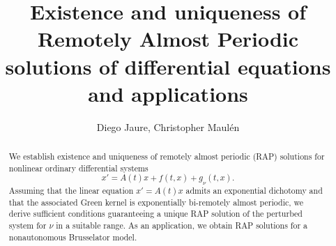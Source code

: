 \documentclass[english,reqno]{amsart}
\numberwithin{equation}{section}
\theoremstyle{plain}
\theoremstyle{definition}
\theoremstyle{remark}
\begin{document}
\title{Existence and uniqueness of Remotely Almost Periodic solutions of differential equations and applications}


\author[Diego Jaure, Christopher Maul\'en]
{Diego Jaure, Christopher Maul\'en}  %


\address{Diego Jaure \newline
Facultad de Ingenier\'ia, Universidad de la Rep\'ublica}

\address{Christopher Maul\'en \newline
Departamento de Matem\'aticas, Universidad de Chile}



\begin{abstract}
We establish existence and uniqueness of remotely almost periodic (RAP) solutions for nonlinear ordinary differential systems
\[
x' = A(t)x + f(t,x) + g_{\nu}(t,x).
\]
Assuming that the linear equation $x' = A(t)x$ admits an exponential dichotomy and that the associated Green kernel is exponentially bi-remotely almost periodic, we derive sufficient conditions guaranteeing a unique RAP solution of the perturbed system for $\nu$ in a suitable range. As an application, we obtain RAP solutions for a nonautonomous Brusselator model.
\end{abstract}

\maketitle

\end{document}
